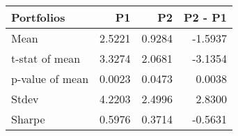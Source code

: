 \begin{tabular}{lrrr}
\toprule
Portfolios & P1 & P2 & P2 - P1 \\
\midrule
Mean & 2.5221 & 0.9284 & -1.5937 \\
t-stat of mean & 3.3274 & 2.0681 & -3.1354 \\
p-value of mean & 0.0023 & 0.0473 & 0.0038 \\
Stdev & 4.2203 & 2.4996 & 2.8300 \\
Sharpe & 0.5976 & 0.3714 & -0.5631 \\
\bottomrule
\end{tabular}

